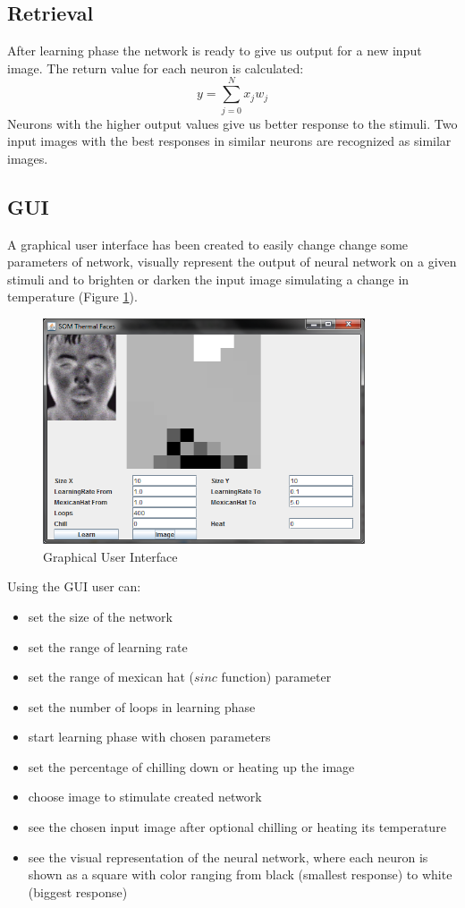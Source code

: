 \documentclass[pdftex]{article}
\begin{document}
\subsection{Retrieval}
After learning phase the network is ready to give us output for a new input image. The return value for each neuron is calculated:
$$ y=\sum_{j=0}^{N}x_jw_j $$
Neurons with the higher output values give us better response to the stimuli. Two input images with the best responses in similar neurons are recognized as similar images.
\subsection{GUI}
A graphical user interface has been created to easily change change some parameters of network, visually represent the output of neural network on a given stimuli and to brighten or darken the input image simulating a change in temperature (Figure \ref{gui}).
\begin{figure}[!htb]
	\centering
	\includegraphics[width=0.85\textwidth]{pictures/gui.png} 
	\caption{Graphical User Interface}
	\label{gui}
\end{figure}
Using the GUI user can:
\begin{itemize}
\item{set the size of the network}
\item{set the range of learning rate}
\item{set the range of mexican hat ($sinc$ function) parameter}
\item{set the number of loops in learning phase}
\item{start learning phase with chosen parameters}
\item{set the percentage of chilling down or heating up the image}
\item{choose image to stimulate created network}
\item{see the chosen input image after optional chilling or heating its temperature}
\item{see the visual representation of the neural network, where each neuron is shown as a square with color ranging from black (smallest response) to white (biggest response)}
\end{itemize}
\end{document}
